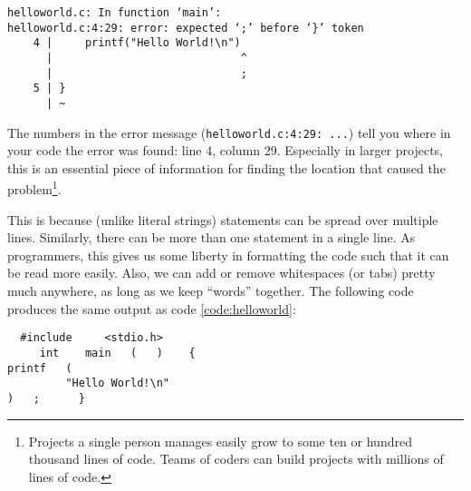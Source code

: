 \begin{cmdbox}
\begin{verbatim}
helloworld.c: In function ‘main’:
helloworld.c:4:29: error: expected ‘;’ before ‘}’ token
    4 |     printf("Hello World!\n")
      |                             ^
      |                             ;
    5 | }
      | ~
\end{verbatim}
\end{cmdbox}

The numbers in the error message (\texttt{helloworld.c:4:29: ...}) tell you where in your code the error was found: line 4, column 29. Especially in larger projects, this is an essential piece of information for finding the location that caused the problem\footnote{Projects a single person manages easily grow to some ten or hundred thousand lines of code. Teams of coders can build projects with millions of lines of code.}.

This is because (unlike literal strings) statements can be spread over multiple lines. Similarly, there can be more than one statement in a single line. As programmers, this gives us some liberty in formatting the code such that it can be read more easily. Also, we can add or remove whitespaces (or tabs) pretty much anywhere, as long as we keep \enquote{words} together. The following code produces the same output as code \ref{code:helloworld}:
\begin{codebox}[whitespaces.c]
\begin{verbatim}
  #include     <stdio.h>
     int    main   (   )    {
printf   (   
         "Hello World!\n"
)   ;      }
\end{verbatim}
 \label{code:optionalWhitespaces}
\end{codebox}

